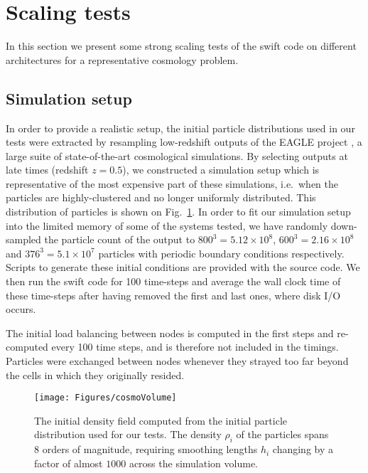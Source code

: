 \documentclass{sig-alternate-05-2015}
\newcommand{\swift}{{\sc swift}\xspace}
\begin{document}

\section{Scaling tests}

In this section we present some strong scaling tests of the \swift code on different
architectures for a representative cosmology problem.

\subsection{Simulation setup}

In order to provide a realistic setup, 
the initial particle distributions used in our tests were extracted by
resampling low-redshift outputs of the EAGLE project \cite{Schaye2015}, a
large suite of state-of-the-art cosmological simulations. By selecting outputs
at late times (redshift $z=0.5$), we constructed a simulation setup which is
representative of the most expensive part of these simulations, i.e.~when the
particles are highly-clustered and no longer uniformly distributed. This
distribution of particles is shown on Fig.~\ref{fig:ICs}.
In order to fit our simulation setup into the limited
memory of some of the systems tested, we have randomly down-sampled the particle
count of the output to $800^3=5.12\times10^8$, $600^3=2.16\times10^8$ and
$376^3=5.1\times10^7$ particles with periodic boundary conditions 
respectively. Scripts to generate these initial
conditions are provided with the source code. We then run the \swift code for
100 time-steps and average the wall clock time of these time-steps after having
removed the first and last ones, where disk I/O occurs.

The initial load balancing between nodes is computed in the first steps and
re-computed every 100 time steps, and is therefore not included in the timings.
Particles were exchanged between nodes whenever they strayed too far beyond
the cells in which they originally resided.

\begin{figure}
\centering
\texttt{[image: Figures/cosmoVolume]}
\caption{The initial density field computed from the initial particle
  distribution used for our tests. The density $\rho_i$ of the particles spans 8
  orders of magnitude, requiring smoothing lengths $h_i$ changing by a factor of
  almost $1000$ across the simulation volume. \label{fig:ICs}}
\end{figure}  
\end{document}
